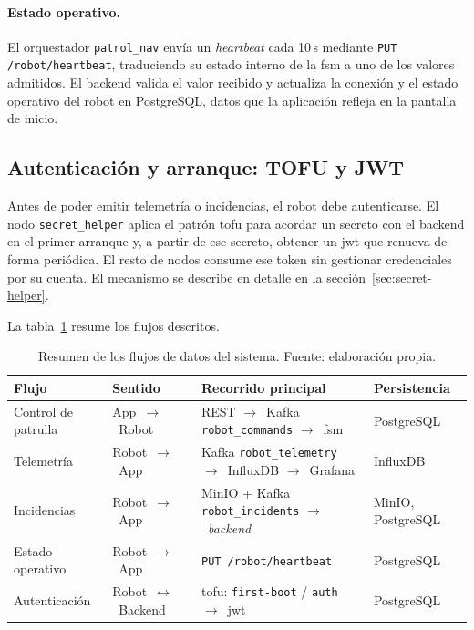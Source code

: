 \paragraph*{Estado operativo.} El orquestador \texttt{patrol\_nav} envía un
\textit{heartbeat} cada 10\,s mediante \texttt{PUT /robot/heartbeat},
traduciendo su estado interno de la \gls{fsm} a uno de los valores admitidos. El
backend valida el valor recibido y actualiza la conexión y el estado operativo del
robot en PostgreSQL, datos que la aplicación refleja en la pantalla de inicio.

\subsection{Autenticación y arranque: TOFU y JWT}
\label{sec:flujo-tofu}

Antes de poder emitir telemetría o incidencias, el robot debe autenticarse. El nodo
\texttt{secret\_helper} aplica el patrón \gls{tofu} para acordar un secreto con el
backend en el primer arranque y, a partir de ese secreto, obtener un \gls{jwt} que
renueva de forma periódica. El resto de nodos consume ese token sin gestionar
credenciales por su cuenta. El mecanismo se describe en detalle en la
sección~\ref{sec:secret-helper}.

La tabla~\ref{tab:flujos} resume los flujos descritos.

\begin{table}[htbp]
  \centering
  \small
  \caption{Resumen de los flujos de datos del sistema. Fuente: elaboración propia.}
  \label{tab:flujos}
  \begin{tabular}{@{}>{\raggedright\arraybackslash}p{2.3cm}
                     >{\raggedright\arraybackslash}p{2.8cm}
                     >{\raggedright\arraybackslash}p{5.0cm}
                     >{\raggedright\arraybackslash}p{2.4cm}@{}}
    \toprule
    \textbf{Flujo} & \textbf{Sentido} & \textbf{Recorrido principal} &
    \textbf{Persistencia} \\
    \midrule
    Control de patrulla & App~$\rightarrow$~Robot &
    REST $\rightarrow$~Kafka \texttt{robot\_commands} $\rightarrow$~\gls{fsm} &
    PostgreSQL \\
    \addlinespace[7pt]
    Telemetría & Robot~$\rightarrow$~App &
    Kafka \texttt{robot\_telemetry} $\rightarrow$~InfluxDB $\rightarrow$~Grafana &
    InfluxDB \\
    \addlinespace[7pt]
    Incidencias & Robot~$\rightarrow$~App &
    MinIO + Kafka \texttt{robot\_incidents} $\rightarrow$~\textit{backend} &
    MinIO, PostgreSQL \\
    \addlinespace[7pt]
    Estado operativo & Robot~$\rightarrow$~App &
    \texttt{PUT /robot/heartbeat} & PostgreSQL \\
    \addlinespace[7pt]
    Autenticación & Robot~$\leftrightarrow$~Backend &
    \gls{tofu}: \texttt{first-boot} / \texttt{auth} $\rightarrow$~\gls{jwt} &
    PostgreSQL \\
    \bottomrule
  \end{tabular}
\end{table}

